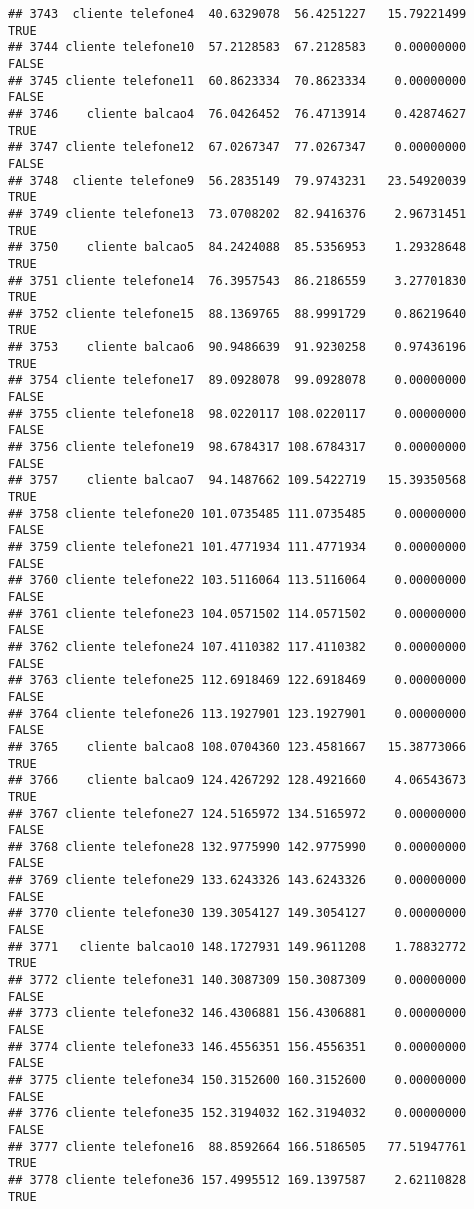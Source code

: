 \documentclass[
]{article}
\begin{document}
\begin{verbatim}
## 3743  cliente telefone4  40.6329078  56.4251227   15.79221499     TRUE
## 3744 cliente telefone10  57.2128583  67.2128583    0.00000000    FALSE
## 3745 cliente telefone11  60.8623334  70.8623334    0.00000000    FALSE
## 3746    cliente balcao4  76.0426452  76.4713914    0.42874627     TRUE
## 3747 cliente telefone12  67.0267347  77.0267347    0.00000000    FALSE
## 3748  cliente telefone9  56.2835149  79.9743231   23.54920039     TRUE
## 3749 cliente telefone13  73.0708202  82.9416376    2.96731451     TRUE
## 3750    cliente balcao5  84.2424088  85.5356953    1.29328648     TRUE
## 3751 cliente telefone14  76.3957543  86.2186559    3.27701830     TRUE
## 3752 cliente telefone15  88.1369765  88.9991729    0.86219640     TRUE
## 3753    cliente balcao6  90.9486639  91.9230258    0.97436196     TRUE
## 3754 cliente telefone17  89.0928078  99.0928078    0.00000000    FALSE
## 3755 cliente telefone18  98.0220117 108.0220117    0.00000000    FALSE
## 3756 cliente telefone19  98.6784317 108.6784317    0.00000000    FALSE
## 3757    cliente balcao7  94.1487662 109.5422719   15.39350568     TRUE
## 3758 cliente telefone20 101.0735485 111.0735485    0.00000000    FALSE
## 3759 cliente telefone21 101.4771934 111.4771934    0.00000000    FALSE
## 3760 cliente telefone22 103.5116064 113.5116064    0.00000000    FALSE
## 3761 cliente telefone23 104.0571502 114.0571502    0.00000000    FALSE
## 3762 cliente telefone24 107.4110382 117.4110382    0.00000000    FALSE
## 3763 cliente telefone25 112.6918469 122.6918469    0.00000000    FALSE
## 3764 cliente telefone26 113.1927901 123.1927901    0.00000000    FALSE
## 3765    cliente balcao8 108.0704360 123.4581667   15.38773066     TRUE
## 3766    cliente balcao9 124.4267292 128.4921660    4.06543673     TRUE
## 3767 cliente telefone27 124.5165972 134.5165972    0.00000000    FALSE
## 3768 cliente telefone28 132.9775990 142.9775990    0.00000000    FALSE
## 3769 cliente telefone29 133.6243326 143.6243326    0.00000000    FALSE
## 3770 cliente telefone30 139.3054127 149.3054127    0.00000000    FALSE
## 3771   cliente balcao10 148.1727931 149.9611208    1.78832772     TRUE
## 3772 cliente telefone31 140.3087309 150.3087309    0.00000000    FALSE
## 3773 cliente telefone32 146.4306881 156.4306881    0.00000000    FALSE
## 3774 cliente telefone33 146.4556351 156.4556351    0.00000000    FALSE
## 3775 cliente telefone34 150.3152600 160.3152600    0.00000000    FALSE
## 3776 cliente telefone35 152.3194032 162.3194032    0.00000000    FALSE
## 3777 cliente telefone16  88.8592664 166.5186505   77.51947761     TRUE
## 3778 cliente telefone36 157.4995512 169.1397587    2.62110828     TRUE

\end{verbatim}
\end{document}
